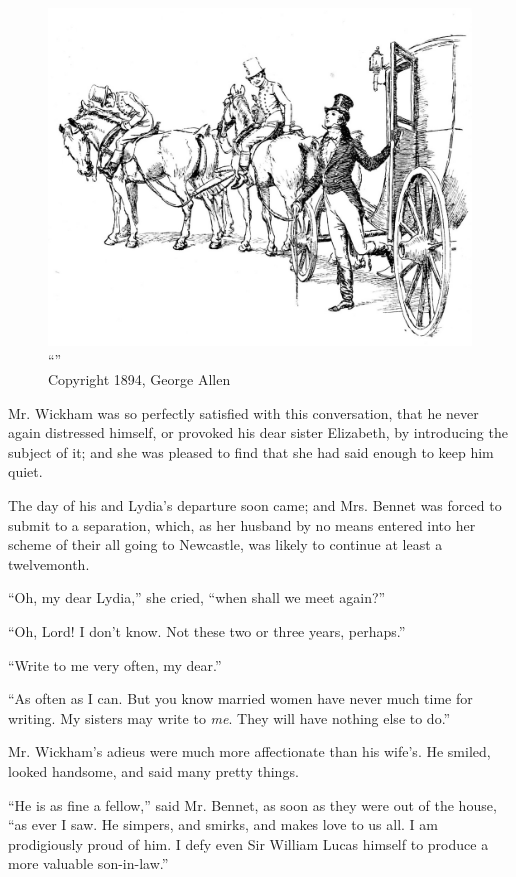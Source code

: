 \begin{figure}[htbp]
    \centering
    \includegraphics[width=\textwidth]{illustrations/i_031.jpg}
    \caption{“”\\ Copyright 1894, George Allen}
    \label{fig:image}
\end{figure}


Mr. Wickham was so perfectly satisfied with this conversation, that he never again distressed himself, or provoked his dear sister Elizabeth, by introducing the subject of it; and she was pleased to find that she had said enough to keep him quiet.

The day of his and Lydia's departure soon came; and Mrs. Bennet was forced to submit to a separation, which, as her husband by no means entered into her scheme of their all going to Newcastle, was likely to continue at least a twelvemonth.

``Oh, my dear Lydia,'' she cried, ``when shall we meet again?''

``Oh, Lord! I don't know. Not these two or three years, perhaps.''

``Write to me very often, my dear.''

``As often as I can. But you know married women have never much time for writing. My sisters may write to \textit{me}. They will have nothing else to do.''

Mr. Wickham's adieus were much more affectionate than his wife's. He smiled, looked handsome, and said many pretty things.

``He is as fine a fellow,'' said Mr. Bennet, as soon as they were out of the house, ``as ever I saw. He simpers, and smirks, and makes love to us all. I am prodigiously proud of him. I defy even Sir William Lucas himself to produce a more valuable son-in-law.''


